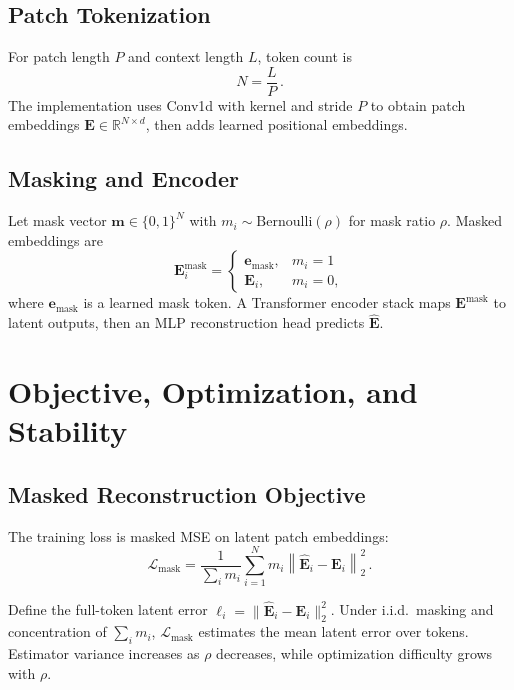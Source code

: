 \documentclass[journal]{IEEEtran}
\begin{document}
\subsection{Patch Tokenization}
For patch length $P$ and context length $L$, token count is
\begin{equation}
N = \frac{L}{P}\,.
\label{eq:token_count}
\end{equation}
The implementation uses Conv1d with kernel and stride $P$ to obtain patch embeddings $\mathbf{E} \in \mathbb{R}^{N \times d}$, then adds learned positional embeddings.

\subsection{Masking and Encoder}
Let mask vector $\mathbf{m} \in \{0,1\}^{N}$ with $m_i \sim \mathrm{Bernoulli}(\rho)$ for mask ratio $\rho$. Masked embeddings are
\begin{equation}
\mathbf{E}^{\text{mask}}_i =
\begin{cases}
\mathbf{e}_{\text{mask}}, & m_i = 1 \\
\mathbf{E}_i, & m_i = 0,
\end{cases}
\label{eq:masking}
\end{equation}
where $\mathbf{e}_{\text{mask}}$ is a learned mask token. A Transformer encoder stack \cite{vaswani2017} maps $\mathbf{E}^{\text{mask}}$ to latent outputs, then an MLP reconstruction head predicts $\hat{\mathbf{E}}$.

\section{Objective, Optimization, and Stability}
\subsection{Masked Reconstruction Objective}
The training loss is masked MSE on latent patch embeddings:
\begin{equation}
\mathcal{L}_{\text{mask}} = \frac{1}{\sum_i m_i} \sum_{i=1}^{N} m_i \left\|\hat{\mathbf{E}}_i - \mathbf{E}_i\right\|_2^2\,.
\label{eq:loss}
\end{equation}

Define the full-token latent error $\ell_i = \|\hat{\mathbf{E}}_i - \mathbf{E}_i\|_2^2$. Under i.i.d.\ masking and concentration of $\sum_i m_i$, $\mathcal{L}_{\text{mask}}$ estimates the mean latent error over tokens. Estimator variance increases as $\rho$ decreases, while optimization difficulty grows with $\rho$.
\end{document}
